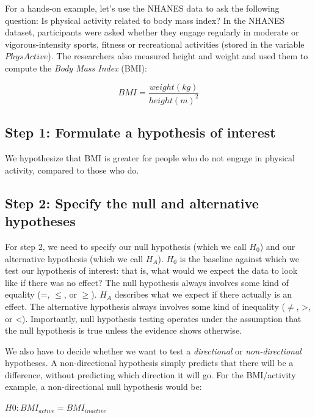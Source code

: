 \documentclass[12pt,]{book}
\theoremstyle{definition}
\theoremstyle{definition}
\theoremstyle{definition}
\theoremstyle{remark}
\begin{document}
For a hands-on example, let's use the NHANES data to ask the following question: Is physical activity related to body mass index? In the NHANES dataset, participants were asked whether they engage regularly in moderate or vigorous-intensity sports, fitness or recreational activities (stored in the variable \(PhysActive\)). The researchers also measured height and weight and used them to compute the \emph{Body Mass Index} (BMI):

\[
BMI = \frac{weight(kg)}{height(m)^2}
\]

\hypertarget{step-1-formulate-a-hypothesis-of-interest}{%
\subsection{Step 1: Formulate a hypothesis of interest}\label{step-1-formulate-a-hypothesis-of-interest}}

We hypothesize that BMI is greater for people who do not engage in physical activity, compared to those who do.

\hypertarget{step-2-specify-the-null-and-alternative-hypotheses}{%
\subsection{Step 2: Specify the null and alternative hypotheses}\label{step-2-specify-the-null-and-alternative-hypotheses}}

For step 2, we need to specify our null hypothesis (which we call \(H_0\)) and our alternative hypothesis (which we call \(H_A\)). \(H_0\) is the baseline against which we test our hypothesis of interest: that is, what would we expect the data to look like if there was no effect? The null hypothesis always involves some kind of equality (=, \(\le\), or \(\ge\)). \(H_A\) describes what we expect if there actually is an effect. The alternative hypothesis always involves some kind of inequality (\(\ne\), \textgreater{}, or \textless{}). Importantly, null hypothesis testing operates under the assumption that the null hypothesis is true unless the evidence shows otherwise.

We also have to decide whether we want to test a \emph{directional} or \emph{non-directional} hypotheses. A non-directional hypothesis simply predicts that there will be a difference, without predicting which direction it will go. For the BMI/activity example, a non-directional null hypothesis would be:

\(H0: BMI_{active} = BMI_{inactive}\)
\end{document}
